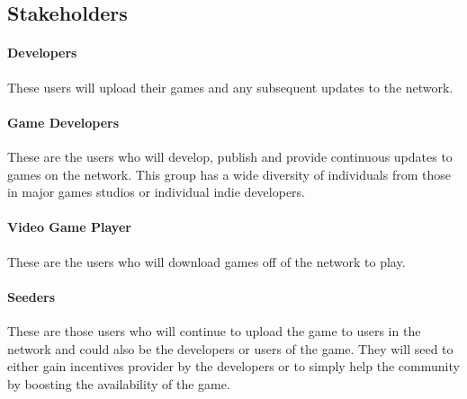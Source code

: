 
\subsection{Stakeholders}

\paragraph{Developers}
These users will upload their games and any subsequent updates to the network. 

\paragraph{Game Developers}
These are the users who will develop, publish and provide continuous updates to games on the network. This group has a wide diversity of individuals from those in major games studios or individual indie developers. 

\paragraph{Video Game Player}
These are the users who will download games off of the network to play.

\paragraph{Seeders}
These are those users who will continue to upload the game to users in the network and could also be the developers or users of the game. They will seed to either gain incentives provider by the developers or to simply help the community by boosting the availability of the game.